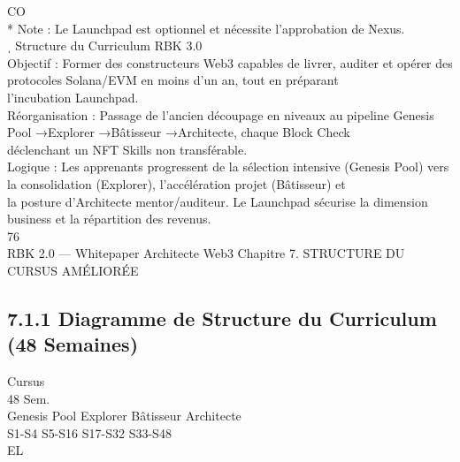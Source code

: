 CO\\
* Note : Le Launchpad est optionnel et nécessite l’approbation de Nexus.\\
\vspace{0.5em}
ˌ Structure du Curriculum RBK 3.0\\
\vspace{0.5em}
Objectif : Former des constructeurs Web3 capables de livrer, auditer et opérer des protocoles Solana/EVM en moins d’un an, tout en préparant\\
l’incubation Launchpad.\\
Réorganisation : Passage de l’ancien découpage en niveaux au pipeline Genesis Pool →Explorer →Bâtisseur →Architecte, chaque Block Check\\
déclenchant un NFT Skills non transférable.\\
Logique : Les apprenants progressent de la sélection intensive (Genesis Pool) vers la consolidation (Explorer), l’accélération projet (Bâtisseur) et\\
la posture d’Architecte mentor/auditeur. Le Launchpad sécurise la dimension business et la répartition des revenus.\\
\vspace{0.5em}
\vspace{0.5em}
\vspace{0.5em}
\vspace{0.5em}
76\\
RBK 2.0 — Whitepaper Architecte Web3                                                            Chapitre 7. STRUCTURE DU CURSUS AMÉLIORÉE\\
\vspace{0.5em}
\vspace{0.5em}
\subsection{7.1.1 Diagramme de Structure du Curriculum (48 Semaines)}
\vspace{0.5em}
Cursus\\
48 Sem.\\
\vspace{0.5em}
\vspace{0.5em}
Genesis Pool                        Explorer                          Bâtisseur                         Architecte\\
\vspace{0.5em}
\vspace{0.5em}
S1-S4                            S5-S16                            S17-S32                            S33-S48\\
\vspace{0.5em}
\vspace{0.5em}
\vspace{0.5em}
\vspace{0.5em}
EL\\
